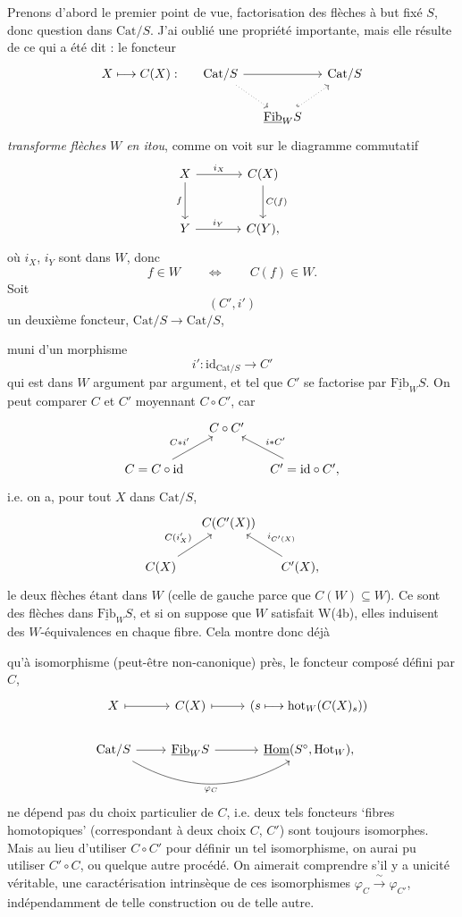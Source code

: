 \documentclass[11pt]{article}
\newcommand{\printedpage}[1]{{\reversemarginpar\marginnote{\raggedleft\scriptsize ed.~#1}}}
\newcommand{\msp}[1]{\marginpar{\raggedright\scriptsize ms.~#1}}
\newcommand{\Fib}{\underline{\mathrm{Fib}}}
\newcommand{\Hom}{\underline{\mathrm{Hom}}}
\newcommand{\Cat}{\mathrm{Cat}}
\begin{document}
Prenons d'abord le premier point de vue, factorisation des flèches à but fixé $S$, donc question dans $\Cat/S$. J'ai oublié une propriété importante, mais elle résulte de ce qui a été dit : le foncteur
\[
\begin{tikzcd}[column sep=small]
X \longmapsto C(X) : & \Cat/S \arrow[rr] \arrow[dr, dotted] & & \Cat/S \\
& & \Fib_W S \arrow[ur, dotted, hook] &
\end{tikzcd}
\]
\textit{transforme} \textit{flèches} \textit{$W$ en itou}, comme on voit sur le diagramme commutatif
\[
\begin{tikzcd}[row sep=large, column sep=large]
X \arrow[r, "i_X"] \arrow[d, "f"'] & C(X) \arrow[d, "C(f)"] \\
Y \arrow[r, "i_Y"] & C(Y),
\end{tikzcd}
\]
où $i_X$, $i_Y$ sont dans $W$, donc
\[
f \in W \qquad \Longleftrightarrow \qquad C(f) \in W.
\]
Soit
\[
(C',i')
\]
un deuxième foncteur, $\Cat/S \longrightarrow \Cat/S$,

\msp{page 195}
muni d'un morphisme
\[
i' : \mathrm{id}_{\Cat/S} \longrightarrow C'
\]
qui est dans $W$ argument par argument, et tel que $C'$ se factorise par $\Fib_W S$. On peut comparer $C$ et $C'$ moyennant $C \circ C'$, car
\[
\begin{tikzcd}[column sep=small]
& C \circ C' & \\
C = C \circ \mathrm{id} \arrow[ur, "C\ast i'"] & & C' = \mathrm{id} \circ C', \arrow[ul, "i\ast C'"']
\end{tikzcd}
\]
\printedpage{129}
i.e. on a, pour tout $X$ dans $\Cat/S$,
\[
\begin{tikzcd}[column sep=small]
& C(C'(X)) & \\
C(X) \arrow[ur, "C(i'_X)"] & & C'(X), \arrow[ul, "i_{C'(X)}"']
\end{tikzcd}
\]
le deux flèches étant dans $W$ (celle de gauche parce que $C(W) \subseteq W$). Ce sont des flèches dans $\Fib_W S$, et si on suppose que $W$ satisfait W(4b), elles induisent des $W$-équivalences en chaque fibre. Cela montre donc déjà %

\msp{page 196}
qu'à isomorphisme (peut-être non-canonique) près, le foncteur composé défini par $C$,
\[
\begin{tikzcd}
X \arrow[r, mapsto] & C(X) \arrow[r, mapsto] & (s \longmapsto \mathrm{hot}_W(C(X)_s)) \\
\Cat/S \arrow[r] \arrow[rr, bend right, "\varphi_C"'] & \Fib_W S \arrow[r] & \Hom(S^\circ,\mathrm{Hot}_W),
\end{tikzcd}
\]
ne dépend pas du choix particulier de $C$, i.e. deux tels foncteurs `fibres homotopiques' (correspondant à deux choix $C$, $C'$) sont toujours isomorphes. Mais au lieu d'utiliser $C \circ C'$ pour définir un tel isomorphisme, on aurai pu utiliser $C' \circ C$, ou quelque autre procédé. On aimerait comprendre s'il y a unicité véritable, une caractérisation intrinsèque de ces isomorphismes $\varphi_C \xrightarrow{\ \sim\ } \varphi_{C'}$, indépendamment de telle construction ou de telle autre. %
\end{document}
